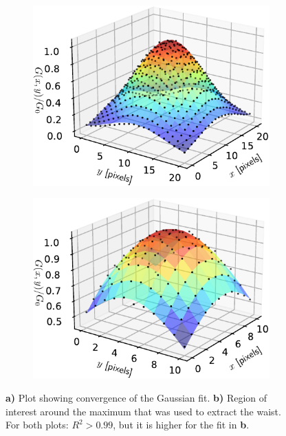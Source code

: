 \begin{figure}
\centering
	\begin{subfigure}{.49\textwidth}
	    \centering
		\includegraphics[width=0.96\linewidth]{figures/3DSpotFitGaussian.pdf}
		\caption{}
		\label{fig:3Dshowing}
	\end{subfigure}
	\begin{subfigure}{.49\textwidth}
		\centering
		\includegraphics[width=0.96\linewidth]{figures/3DSpotFitGaussianSmaller.pdf}
		\caption{}
		\label{fig:3Dwaistfit}
	\end{subfigure}
	\caption{\textbf{a)} Plot showing convergence of the Gaussian fit.
	\textbf{b)} Region of interest around the maximum that was used to extract the waist. For both plots: $R^2>0.99$, but it is higher for the fit in \textbf{b}.}
	\label{fig:3Dfits}
\end{figure}

